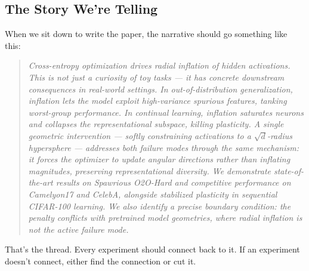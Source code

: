 \documentclass[11pt,a4paper]{article}
\begin{document}
\subsection{The Story We're Telling}

When we sit down to write the paper, the narrative should go something like this:

\begin{quote}
\emph{Cross-entropy optimization drives radial inflation of hidden activations. This is not just a curiosity of toy tasks --- it has concrete downstream consequences in real-world settings. In out-of-distribution generalization, inflation lets the model exploit high-variance spurious features, tanking worst-group performance. In continual learning, inflation saturates neurons and collapses the representational subspace, killing plasticity. A single geometric intervention --- softly constraining activations to a $\sqrt{d}$-radius hypersphere --- addresses both failure modes through the same mechanism: it forces the optimizer to update angular directions rather than inflating magnitudes, preserving representational diversity. We demonstrate state-of-the-art results on Spawrious O2O-Hard and competitive performance on Camelyon17 and CelebA, alongside stabilized plasticity in sequential CIFAR-100 learning. We also identify a precise boundary condition: the penalty conflicts with pretrained model geometries, where radial inflation is not the active failure mode.}
\end{quote}

That's the thread. Every experiment should connect back to it. If an experiment doesn't connect, either find the connection or cut it.
\end{document}
